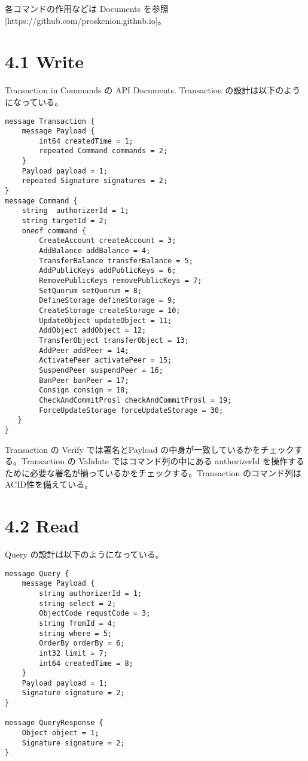 各コマンドの作用などは Documents
を参照{[}https://github.com/proskenion.github.io{]}。

\hypertarget{write}{%
\section{4.1 Write}\label{write}}

Transaction in Commands の API Documents. Transaction
の設計は以下のようになっている。

\begin{verbatim}
message Transaction {
    message Payload {
        int64 createdTime = 1;
        repeated Command commands = 2;
    }
    Payload payload = 1;
    repeated Signature signatures = 2;
}
message Command {
    string  authorizerId = 1;
    string targetId = 2;
    oneof command {
        CreateAccount createAccount = 3;
        AddBalance addBalance = 4;
        TransferBalance transferBalance = 5;
        AddPublicKeys addPublicKeys = 6;
        RemovePublicKeys removePublicKeys = 7;
        SetQuorum setQuorum = 8;
        DefineStorage defineStorage = 9;
        CreateStorage createStorage = 10;
        UpdateObject updateObject = 11;
        AddObject addObject = 12;
        TransferObject transferObject = 13;
        AddPeer addPeer = 14;
        ActivatePeer activatePeer = 15;
        SuspendPeer suspendPeer = 16;
        BanPeer banPeer = 17;
        Consign consign = 18;
        CheckAndCommitProsl checkAndCommitProsl = 19;
        ForceUpdateStorage forceUpdateStorage = 30;
   }
}
\end{verbatim}

Transaction の Verify では署名とPayload
の中身が一致しているかをチェックする。Transaction の Validate
ではコマンド列の中にある authorizerId
を操作するために必要な署名が揃っているかをチェックする。Transaction
のコマンド列はACID性を備えている。

\hypertarget{read}{%
\section{4.2 Read}\label{read}}

Query の設計は以下のようになっている。

\begin{verbatim}
message Query {
    message Payload {
        string authorizerId = 1;
        string select = 2;
        ObjectCode requstCode = 3;
        string fromId = 4;
        string where = 5;
        OrderBy orderBy = 6;
        int32 limit = 7;
        int64 createdTime = 8;
    }
    Payload payload = 1;
    Signature signature = 2;
}

message QueryResponse {
    Object object = 1;
    Signature signature = 2;
}
\end{verbatim}

